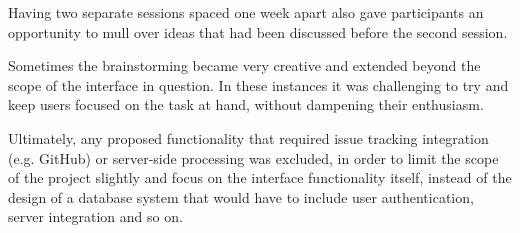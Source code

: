 Having two separate sessions spaced one week apart also gave participants an opportunity to mull over ideas that had been discussed before the second session. 

Sometimes the brainstorming became very creative and extended beyond the scope of the interface in question. In these instances it  was challenging to try and keep users focused on the task at hand, without dampening their enthusiasm. 

Ultimately, any proposed functionality that required issue tracking integration (e.g. GitHub) or server-side processing was excluded, in order to limit the scope of the project slightly and focus on the interface functionality itself, instead of the design of a database system that would have to include user authentication, server integration and so on. 
